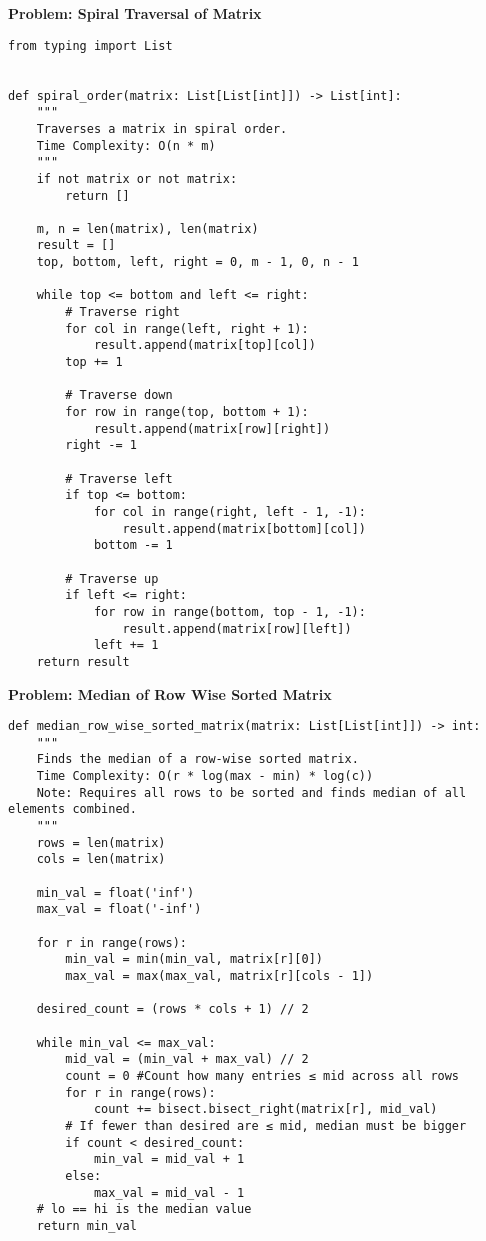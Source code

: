 \noindent\textbf{Problem: Spiral Traversal of Matrix}
\begin{verbatim}
from typing import List


def spiral_order(matrix: List[List[int]]) -> List[int]:
    """
    Traverses a matrix in spiral order.
    Time Complexity: O(n * m)
    """
    if not matrix or not matrix:
        return []

    m, n = len(matrix), len(matrix)
    result = []
    top, bottom, left, right = 0, m - 1, 0, n - 1

    while top <= bottom and left <= right:
        # Traverse right
        for col in range(left, right + 1):
            result.append(matrix[top][col])
        top += 1

        # Traverse down
        for row in range(top, bottom + 1):
            result.append(matrix[row][right])
        right -= 1

        # Traverse left
        if top <= bottom:
            for col in range(right, left - 1, -1):
                result.append(matrix[bottom][col])
            bottom -= 1

        # Traverse up
        if left <= right:
            for row in range(bottom, top - 1, -1):
                result.append(matrix[row][left])
            left += 1
    return result
\end{verbatim}

\noindent\textbf{Problem: Median of Row Wise Sorted Matrix}
\begin{verbatim}
def median_row_wise_sorted_matrix(matrix: List[List[int]]) -> int:
    """
    Finds the median of a row-wise sorted matrix.
    Time Complexity: O(r * log(max - min) * log(c))
    Note: Requires all rows to be sorted and finds median of all elements combined.
    """
    rows = len(matrix)
    cols = len(matrix)

    min_val = float('inf')
    max_val = float('-inf')

    for r in range(rows):
        min_val = min(min_val, matrix[r][0])
        max_val = max(max_val, matrix[r][cols - 1])

    desired_count = (rows * cols + 1) // 2

    while min_val <= max_val:
        mid_val = (min_val + max_val) // 2
        count = 0 #Count how many entries ≤ mid across all rows
        for r in range(rows):
            count += bisect.bisect_right(matrix[r], mid_val)
        # If fewer than desired are ≤ mid, median must be bigger
        if count < desired_count:
            min_val = mid_val + 1
        else:
            max_val = mid_val - 1
    # lo == hi is the median value
    return min_val
\end{verbatim}

